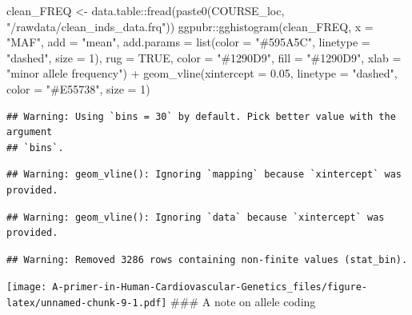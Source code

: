\documentclass[
]{book}
\newenvironment{Shaded}{\begin{snugshade}}{\end{snugshade}}
\newcommand{\AttributeTok}[1]{\textcolor[rgb]{0.77,0.63,0.00}{#1}}
\newcommand{\ConstantTok}[1]{\textcolor[rgb]{0.00,0.00,0.00}{#1}}
\newcommand{\DecValTok}[1]{\textcolor[rgb]{0.00,0.00,0.81}{#1}}
\newcommand{\FloatTok}[1]{\textcolor[rgb]{0.00,0.00,0.81}{#1}}
\newcommand{\FunctionTok}[1]{\textcolor[rgb]{0.00,0.00,0.00}{#1}}
\newcommand{\NormalTok}[1]{#1}
\newcommand{\OtherTok}[1]{\textcolor[rgb]{0.56,0.35,0.01}{#1}}
\newcommand{\SpecialCharTok}[1]{\textcolor[rgb]{0.00,0.00,0.00}{#1}}
\newcommand{\StringTok}[1]{\textcolor[rgb]{0.31,0.60,0.02}{#1}}
\begin{document}
\begin{Shaded}
\begin{Highlighting}[]
\NormalTok{clean\_FREQ }\OtherTok{\textless{}{-}}\NormalTok{ data.table}\SpecialCharTok{::}\FunctionTok{fread}\NormalTok{(}\FunctionTok{paste0}\NormalTok{(COURSE\_loc, }\StringTok{"/rawdata/clean\_inds\_data.frq"}\NormalTok{))}
\NormalTok{ggpubr}\SpecialCharTok{::}\FunctionTok{gghistogram}\NormalTok{(clean\_FREQ, }\AttributeTok{x =} \StringTok{"MAF"}\NormalTok{,}
                    \AttributeTok{add =} \StringTok{"mean"}\NormalTok{, }\AttributeTok{add.params =} \FunctionTok{list}\NormalTok{(}\AttributeTok{color =} \StringTok{"\#595A5C"}\NormalTok{, }\AttributeTok{linetype =} \StringTok{"dashed"}\NormalTok{, }\AttributeTok{size =} \DecValTok{1}\NormalTok{),}
                    \AttributeTok{rug =} \ConstantTok{TRUE}\NormalTok{,}
                    \AttributeTok{color =} \StringTok{"\#1290D9"}\NormalTok{, }\AttributeTok{fill =} \StringTok{"\#1290D9"}\NormalTok{,}
                    \AttributeTok{xlab =} \StringTok{"minor allele frequency"}\NormalTok{) }\SpecialCharTok{+}
  \FunctionTok{geom\_vline}\NormalTok{(}\AttributeTok{xintercept =} \FloatTok{0.05}\NormalTok{, }\AttributeTok{linetype =} \StringTok{"dashed"}\NormalTok{,}
                \AttributeTok{color =} \StringTok{"\#E55738"}\NormalTok{, }\AttributeTok{size =} \DecValTok{1}\NormalTok{)}
\end{Highlighting}
\end{Shaded}

\begin{verbatim}
## Warning: Using `bins = 30` by default. Pick better value with the argument
## `bins`.
\end{verbatim}

\begin{verbatim}
## Warning: geom_vline(): Ignoring `mapping` because `xintercept` was provided.
\end{verbatim}

\begin{verbatim}
## Warning: geom_vline(): Ignoring `data` because `xintercept` was provided.
\end{verbatim}

\begin{verbatim}
## Warning: Removed 3286 rows containing non-finite values (stat_bin).
\end{verbatim}

\texttt{[image: A-primer-in-Human-Cardiovascular-Genetics\_files/figure-latex/unnamed-chunk-9-1.pdf]}
\#\#\# A note on allele coding
\end{document}
